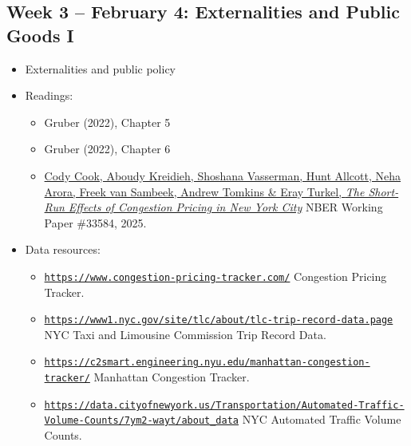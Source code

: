 \documentclass[11pt]{article}
\begin{document}
\subsection*{Week 3 -- February 4: Externalities and Public Goods I}
\begin{itemize}
    \setlength{\itemsep}{0em}
    \item Externalities and public policy
    \item Readings:
    \begin{itemize}
        \item Gruber (2022), Chapter 5
        \item Gruber (2022), Chapter 6
        \item \href{https://www.nber.org/papers/w33584}{Cody Cook, Aboudy Kreidieh, Shoshana Vasserman, Hunt Allcott, Neha Arora, Freek van Sambeek, Andrew Tomkins \& Eray Turkel, \textit{The Short-Run Effects of Congestion Pricing in New York City}} NBER Working Paper \#33584, 2025.
    \end{itemize}
    \item Data resources:
    \begin{itemize}
    \setlength{\itemsep}{0em}
        \item \href{https://www.congestion-pricing-tracker.com/}{\nolinkurl{https://www.congestion-pricing-tracker.com/}} Congestion Pricing Tracker.
        \item \href{https://www1.nyc.gov/site/tlc/about/tlc-trip-record-data.page}{\nolinkurl{https://www1.nyc.gov/site/tlc/about/tlc-trip-record-data.page}} NYC Taxi and Limousine Commission Trip Record Data.
        \item \href{https://c2smart.engineering.nyu.edu/manhattan-congestion-tracker/}{\nolinkurl{https://c2smart.engineering.nyu.edu/manhattan-congestion-tracker/}} Manhattan Congestion Tracker.
        \item \href{https://data.cityofnewyork.us/Transportation/Automated-Traffic-Volume-Counts/7ym2-wayt/about_data}{\nolinkurl{https://data.cityofnewyork.us/Transportation/Automated-Traffic-Volume-Counts/7ym2-wayt/about_data}} NYC Automated Traffic Volume Counts.
    \end{itemize} 
\end{itemize}
\end{document}
